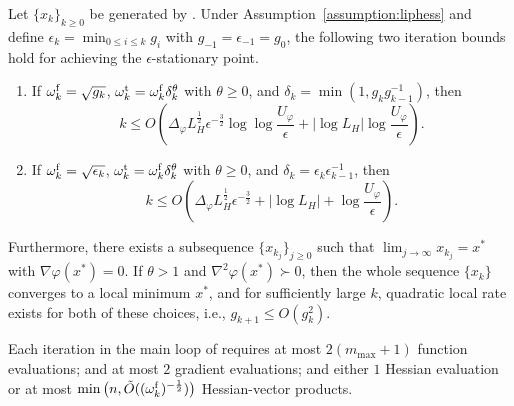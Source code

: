 \begin{theorem}
    \label{thm:newton-local-rate-boosted}
    Let 
    $\{ x_k \}_{k \ge 0}$ 
    be generated by . 
    Under Assumption~\ref{assumption:liphess} and define $\epsilon_k = \min_{0 \leq i \leq k} g_i$ with $g_{-1} = \epsilon_{-1} = g_0$,
    the following two iteration bounds hold for achieving the $\epsilon$-stationary point.
    \begin{enumerate}
        \item
        If $\omega_k^{\mathrm{f}} = \sqrt{g_k}$, $\omega_k^{\mathrm{t}} = \omega_k^{\mathrm{f}} \delta_k^\theta$ with $\theta \geq 0$, and $\delta_k = \min ( 1, g_kg_{k-1}^{-1} )$, 
        then 
        \[
        k\le O\left ( 
            \Delta_\varphi L_H^{\frac{1}{2}} \epsilon^{-\frac{3}{2}}  \log\log \frac{U_\varphi}{\epsilon} 
            + |\log L_H| \log \frac{U_\varphi}{\epsilon}
            \right ).
        \]
        \item
        If $\omega_k^{\mathrm{f}} = \sqrt{\epsilon_k}$, 
        $\omega_k^{\mathrm{t}} = \omega_k^{\mathrm{f}} \delta_k^\theta$ with $\theta \geq 0$,
        and $\delta_k = \epsilon_k\epsilon_{k-1}^{-1}$, 
        then 
        \[
        k\le O\left( 
            \Delta_\varphi L_H^{\frac{1}{2}} \epsilon^{-\frac{3}{2}} +  |\log L_H|
            + \log \frac{U_\varphi}{\epsilon}
            \right).
            \]
    \end{enumerate}
    Furthermore, there exists a subsequence $\{x_{k_j}\}_{j \geq 0}$ such that $\lim_{j \to \infty} x_{k_j} = x^*$ with $\nabla \varphi(x^*) = 0$.
    If $\theta > 1$ and $\nabla^2\varphi(x^*) \succ 0$, then the whole sequence $\{ x_k \}$ converges to a local minimum $x^*$,
    and for sufficiently large $k$, quadratic local rate exists for both of these choices, i.e., $g_{k+1} \leq O(g_k^2)$.
\end{theorem}
\begin{theorem}
    \label{thm:newton-local-rate-boosted-oracle-complexity}
    Each iteration in the main loop of  
    requires
    at most $2(m_{\mathrm{max}}+1)$ function evaluations; 
    and at most $2$ gradient evaluations;
    and either $1$ Hessian evaluation or
    at most $\min\big(n, \tilde O( (\omega_k^{\mathrm{f}})^{-\frac{1}{2}} ) \big )$ Hessian-vector products.
\end{theorem}

